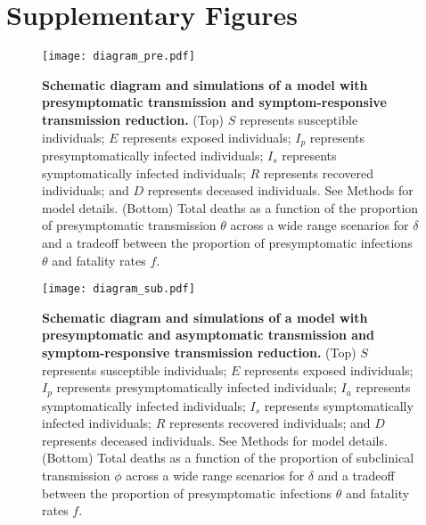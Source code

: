 \documentclass[12pt]{article}
\begin{document}
\pagebreak

\section*{Supplementary Figures}

\begin{figure}[!h]
\begin{center}
\texttt{[image: diagram\_pre.pdf]}
\caption{
\textbf{Schematic diagram and simulations of a model with presymptomatic transmission and symptom-responsive transmission reduction.}
(Top) $S$ represents susceptible individuals; $E$ represents exposed individuals; $I_p$ represents presymptomatically infected individuals; $I_s$ represents symptomatically infected individuals; $R$ represents recovered individuals; and $D$ represents deceased individuals. See Methods for model details.
(Bottom) Total deaths as a function of the proportion of presymptomatic transmission $\theta$ across a wide range scenarios for $\delta$ and a tradeoff between the proportion of presymptomatic infections $\theta$ and fatality rates $f$.
}
\end{center}
\end{figure}

\pagebreak

\begin{figure}[!ht]
\begin{center}
\texttt{[image: diagram\_sub.pdf]}
\caption{
\textbf{Schematic diagram and simulations of a model with presymptomatic and asymptomatic transmission and symptom-responsive transmission reduction.}
(Top) $S$ represents susceptible individuals; $E$ represents exposed individuals; $I_p$ represents presymptomatically infected individuals; $I_a$ represents symptomatically infected individuals; $I_s$ represents symptomatically infected individuals; $R$ represents recovered individuals; and $D$ represents deceased individuals. See Methods for model details.
(Bottom) Total deaths as a function of the proportion of subclinical transmission $\phi$ across a wide range scenarios for $\delta$ and a tradeoff between the proportion of presymptomatic infections $\theta$ and fatality rates $f$.
}
\end{center}
\end{figure}

\pagebreak


\end{document}
